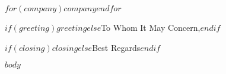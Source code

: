 \documentclass[11pt,a4paper,roman]{moderncv}
\begin{document}
\recipient$for(company)${$company$}$endfor$
\date{\today}
\opening{$if(greeting)$$greeting$$else$To Whom It May Concern,$endif$}
\closing{$if(closing)$$closing$$else$Best Regards$endif$}
\makelettertitle{}

$body$

\vspace{0.5cm}


\makeletterclosing{}
\end{document}
